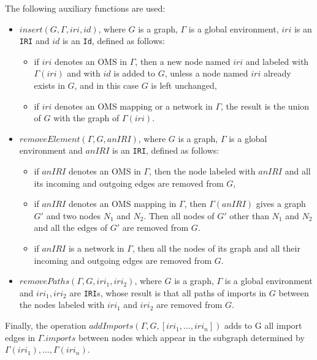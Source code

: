 \documentclass[10pt, a4paper]{isov2}
\newcommand*{\syntax}[1]{\texttt{#1}}
\begin{document}
 The following auxiliary functions are used: 

 \begin{itemize} 
\item $insert(G, \Gamma, iri,id)$, where $G$ is a graph, 
      $\Gamma$ is a global environment, $iri$ is an \syntax{IRI} and 
      $id$ is an \syntax{Id}, defined as follows:
  \begin{itemize} 
    \item if $iri$ denotes an OMS in $\Gamma$, then
                 a new node named $iri$ and labeled with $\Gamma(iri)$ and with $id$ is added to $G$,
                 unless a node named $iri$ already exists in $G$, and in this case $G$ is left unchanged,
   \item if $iri$ denotes an OMS mapping 
      or a network in $\Gamma$, 
      the result is the union of $G$ with the graph of $\Gamma(iri)$.
  \end{itemize} 

\item $removeElement(\Gamma, G, anIRI)$, where $G$ is a graph, 
      $\Gamma$ is a global environment and $anIRI$ is an \syntax{IRI},
      defined as follows: 

  \begin{itemize} 
    \item if $anIRI$ denotes an OMS in $\Gamma$, 
          then the node labeled with $anIRI$ and all its incoming and outgoing
                edges are removed from $G$,
   \item  if $anIRI$ denotes an OMS mapping in $\Gamma$, then  
   $\Gamma(anIRI)$ gives a graph $G'$ and two nodes 
   $N_1$ and $N_2$. Then all nodes of $G'$ other than $N_1$ and
   $N_2$ and all the edges of $G'$ are removed from $G$.
   \item if $anIRI$ is a network in $\Gamma$, then all the nodes of its graph and all their incoming and outgoing edges are removed 
               from $G$.
  \end{itemize} 

 \item $removePaths(\Gamma, G, iri_1, iri_2)$, where $G$ is a graph, 
      $\Gamma$ is a global environment and $iri_1, iri_2$ are \syntax{IRI}s,
 whose result is that
 all paths of imports in $G$ between the nodes labeled with 
 $iri_1$ and $iri_2$ are removed from $G$.

 \end{itemize} 

Finally, the operation $addImports(\Gamma, G, [iri_1, \ldots, iri_n])$ adds to G
all import edges in $\Gamma.imports$ between nodes which appear 
in the subgraph determined by  $\Gamma(iri_1), \ldots, \Gamma(iri_n)$. 
\end{document}
